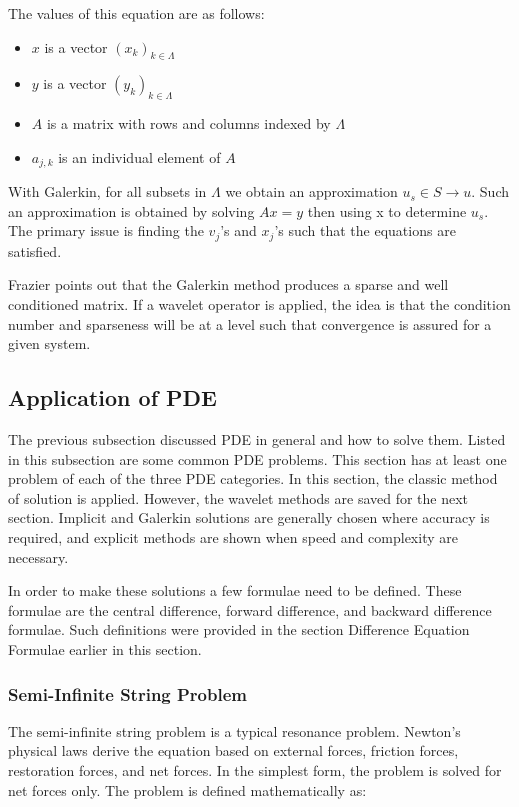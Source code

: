 The values of this equation are as follows:
\begin{itemize}
\item $x$ is a vector $(x_k)_{k\in \Lambda}$
\item $y$ is a vector $(y_k)_{k\in \Lambda}$ 
\item $A$ is a matrix with rows and columns indexed by $\Lambda$
\item $a_{j,k}$ is an individual element of $A$

\end{itemize}

With Galerkin, for all subsets in $\Lambda$ we obtain an approximation $u_s \in S \to u$.  Such an approximation is obtained by %
 solving $Ax=y$ then using x to determine $u_s$.  The primary issue %
 is finding  the $v_j$'s and $x_j$'s such that the equations are satisfied.  

Frazier points %
 out that the Galerkin method produces a sparse and well conditioned %
 matrix. %
   If a wavelet operator is applied, the idea is that the condition number and sparseness will be at a level such that convergence is assured for a given system.  %
   
  

\subsection {Application of PDE}
The previous subsection discussed PDE in general and how to solve them.  Listed in this subsection are some common PDE problems.  This section has at least one problem of each of the three PDE categories.  In this section, the classic method of solution is applied.  However, the wavelet methods are saved for the next section.  Implicit and Galerkin solutions are generally chosen where accuracy is required, and explicit methods are shown when speed and complexity are necessary.  

In order to make these solutions a few formulae need to be defined.  These formulae are the central difference, forward difference, and backward difference formulae.   Such definitions were provided in the section Difference Equation Formulae earlier in this section.  


\subsubsection {Semi-Infinite String Problem}
The semi-infinite string problem is a typical resonance problem.  Newton's physical laws derive the equation based on external forces, friction forces, restoration forces, and net forces.   In the simplest form, the problem is solved for net forces only.  %
The problem is defined mathematically as:

